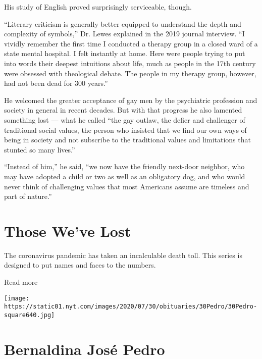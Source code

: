 His study of English proved surprisingly serviceable, though.

``Literary criticism is generally better equipped to understand the
depth and complexity of symbols,'' Dr. Lewes explained in the 2019
journal interview. ``I vividly remember the first time I conducted a
therapy group in a closed ward of a state mental hospital. I felt
instantly at home. Here were people trying to put into words their
deepest intuitions about life, much as people in the 17th century were
obsessed with theological debate. The people in my therapy group,
however, had not been dead for 300 years.''

He welcomed the greater acceptance of gay men by the psychiatric
profession and society in general in recent decades. But with that
progress he also lamented something lost --- what he called ``the gay
outlaw, the defier and challenger of traditional social values, the
person who insisted that we find our own ways of being in society and
not subscribe to the traditional values and limitations that stunted so
many lives.''

``Instead of him,'' he said, ``we now have the friendly next-door
neighbor, who may have adopted a child or two as well as an obligatory
dog, and who would never think of challenging values that most Americans
assume are timeless and part of nature.''

\href{https://www.nytimes.com/interactive/2020/obituaries/people-died-coronavirus-obituaries.html?action=click\&pgtype=Article\&state=default\&region=BELOW_MAIN_CONTENT\&context=covid_obits_promo}{}

\hypertarget{those-weve-lost}{%
\section{Those We've Lost}\label{those-weve-lost}}

The coronavirus pandemic has taken an incalculable death toll. This
series is designed to put names and faces to the numbers.

Read more

\texttt{[image: https://static01.nyt.com/images/2020/07/30/obituaries/30Pedro/30Pedro-square640.jpg]}

\hypertarget{bernaldina-josuxe9-pedro}{%
\section{Bernaldina José Pedro}\label{bernaldina-josuxe9-pedro}}

